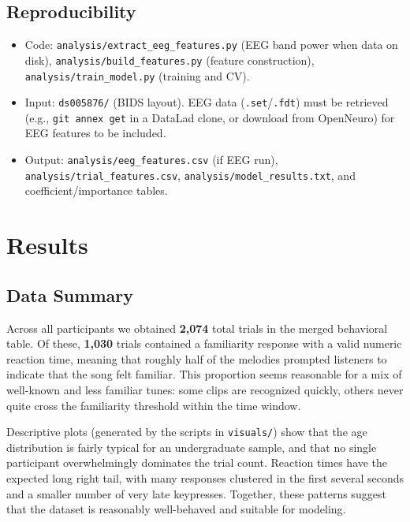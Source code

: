 \documentclass[11pt,a4paper]{article}
\begin{document}
\subsection{Reproducibility}

\begin{itemize}[leftmargin=*]
    \item Code: \texttt{analysis/extract\_eeg\_features.py} (EEG band power when data on disk), \texttt{analysis/build\_features.py} (feature construction), \texttt{analysis/train\_model.py} (training and CV).
    \item Input: \texttt{ds005876/} (BIDS layout). EEG data (\texttt{.set}/\texttt{.fdt}) must be retrieved (e.g., \texttt{git annex get} in a DataLad clone, or download from OpenNeuro) for EEG features to be included.
    \item Output: \texttt{analysis/eeg\_features.csv} (if EEG run), \texttt{analysis/trial\_features.csv}, \texttt{analysis/model\_results.txt}, and coefficient/importance tables.
\end{itemize}

\section{Results}

\subsection{Data Summary}

Across all participants we obtained \textbf{2,074} total trials in the merged behavioral table. Of these, \textbf{1,030} trials contained a familiarity response with a valid numeric reaction time, meaning that roughly half of the melodies prompted listeners to indicate that the song felt familiar. This proportion seems reasonable for a mix of well-known and less familiar tunes: some clips are recognized quickly, others never quite cross the familiarity threshold within the time window.

Descriptive plots (generated by the scripts in \texttt{visuals/}) show that the age distribution is fairly typical for an undergraduate sample, and that no single participant overwhelmingly dominates the trial count. Reaction times have the expected long right tail, with many responses clustered in the first several seconds and a smaller number of very late keypresses. Together, these patterns suggest that the dataset is reasonably well-behaved and suitable for modeling.
\end{document}
